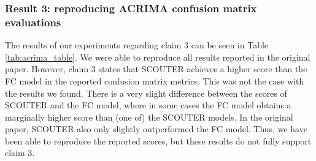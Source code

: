 \subsubsection{Result 3: reproducing ACRIMA confusion matrix evaluations}
The results of our experiments regarding claim 3 can be seen in Table \ref{tab:acrima_table}. We were able to reproduce all results reported in the original paper. However, claim 3 states that SCOUTER achieves a higher score than the FC model in the reported confusion matrix metrics. This was not the case with the results we found. There is a very slight difference between the scores of SCOUTER and the FC model, where in some cases the FC model obtains a marginally higher score than (one of) the SCOUTER models. In the original paper, SCOUTER also only slightly outperformed the FC model. Thus, we have been able to reproduce the reported scores, but these results do not fully support claim 3. 

